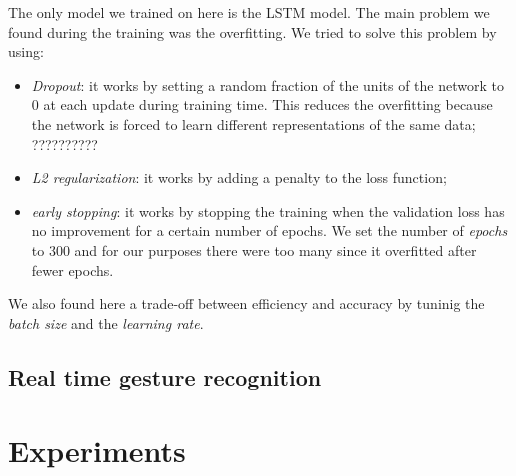 \documentclass[10pt,twocolumn,letterpaper]{article}
\begin{document}
The only model we trained on here is the LSTM model. The main problem we found during the training 
was the overfitting. We tried to solve this problem by using:
\begin{itemize}
   \item \textit{Dropout}: it works by setting a random fraction of the units of the network to 0 
   at each update during training time. This reduces the overfitting 
   because the network is forced to learn different representations of the same data; ??????????
   \item \textit{L2 regularization}: it works by adding a penalty to the loss function;
   \item \textit{early stopping}: it works by stopping the training when the validation loss 
   has no improvement for a certain number of epochs. We set the number of \textit{epochs} to 
   300 and for our purposes there were too many since it overfitted after fewer epochs.
\end{itemize}
We also found here a trade-off between efficiency and accuracy by tuninig 
the \textit{batch size} and the \textit{learning rate}.





\subsection{Real time gesture recognition}

\section{Experiments}
\end{document}
